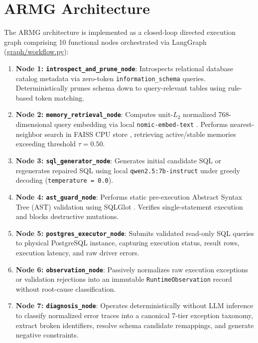 \section{ARMG Architecture}
The ARMG architecture is implemented as a closed-loop directed execution graph comprising 10 functional nodes orchestrated via LangGraph \cite{langgraph2024} (\url{graph/workflow.py}):
\begin{enumerate}
    \item \textbf{Node 1: \texttt{introspect\_\allowbreak and\_\allowbreak prune\_\allowbreak node}}: Introspects relational database catalog metadata via zero-token \texttt{information\_schema} queries. Deterministically prunes schema down to query-relevant tables using rule-based token matching.
    \item \textbf{Node 2: \texttt{memory\_\allowbreak retrieval\_\allowbreak node}}: Computes unit-$L_2$ normalized 768-dimensional query embedding via local \texttt{nomic-embed-text} \cite{nussbaum2024nomic}. Performs nearest-neighbor search in FAISS CPU store \cite{johnson2021faiss}, retrieving active/stable memories exceeding threshold $\tau = 0.50$.
    \item \textbf{Node 3: \texttt{sql\_\allowbreak generator\_\allowbreak node}}: Generates initial candidate SQL or regenerates repaired SQL using local \texttt{qwen2.5:7b-instruct} \cite{qwen2024qwen25} under greedy decoding (\texttt{temperature = 0.0}).
    \item \textbf{Node 4: \texttt{ast\_\allowbreak guard\_\allowbreak node}}: Performs static pre-execution Abstract Syntax Tree (AST) validation using SQLGlot \cite{mao2023sqlglot}. Verifies single-statement execution and blocks destructive mutations.
    \item \textbf{Node 5: \texttt{postgres\_\allowbreak executor\_\allowbreak node}}: Submits validated read-only SQL queries to physical PostgreSQL instance, capturing execution status, result rows, execution latency, and raw driver errors.
    \item \textbf{Node 6: \texttt{observation\_\allowbreak node}}: Passively normalizes raw execution exceptions or validation rejections into an immutable \texttt{Runtime\-Observation} record without root-cause classification.
    \item \textbf{Node 7: \texttt{diagnosis\_\allowbreak node}}: Operates deterministically without LLM inference to classify normalized error traces into a canonical 7-tier exception taxonomy, extract broken identifiers, resolve schema candidate remappings, and generate negative constraints.

\end{enumerate}
